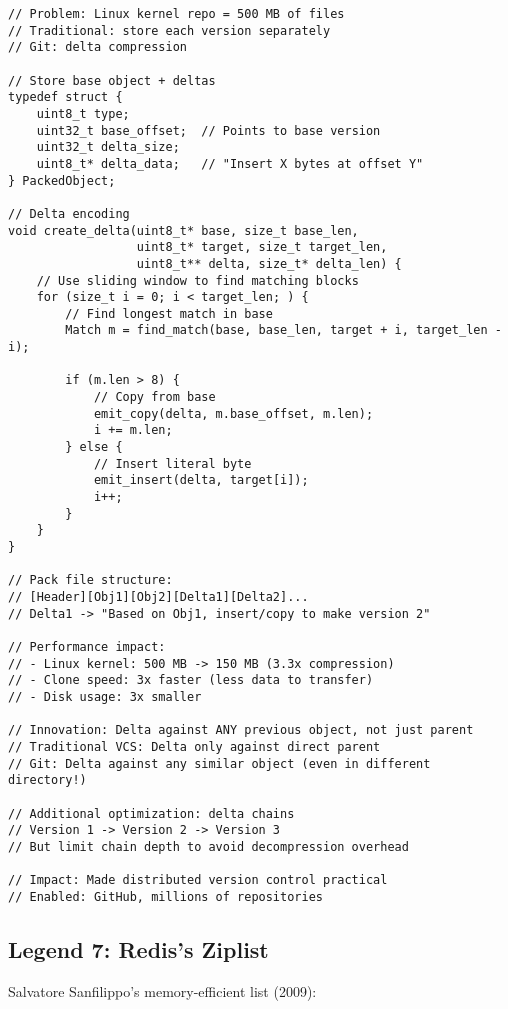 \begin{lstlisting}
// Problem: Linux kernel repo = 500 MB of files
// Traditional: store each version separately
// Git: delta compression

// Store base object + deltas
typedef struct {
    uint8_t type;
    uint32_t base_offset;  // Points to base version
    uint32_t delta_size;
    uint8_t* delta_data;   // "Insert X bytes at offset Y"
} PackedObject;

// Delta encoding
void create_delta(uint8_t* base, size_t base_len,
                  uint8_t* target, size_t target_len,
                  uint8_t** delta, size_t* delta_len) {
    // Use sliding window to find matching blocks
    for (size_t i = 0; i < target_len; ) {
        // Find longest match in base
        Match m = find_match(base, base_len, target + i, target_len - i);

        if (m.len > 8) {
            // Copy from base
            emit_copy(delta, m.base_offset, m.len);
            i += m.len;
        } else {
            // Insert literal byte
            emit_insert(delta, target[i]);
            i++;
        }
    }
}

// Pack file structure:
// [Header][Obj1][Obj2][Delta1][Delta2]...
// Delta1 -> "Based on Obj1, insert/copy to make version 2"

// Performance impact:
// - Linux kernel: 500 MB -> 150 MB (3.3x compression)
// - Clone speed: 3x faster (less data to transfer)
// - Disk usage: 3x smaller

// Innovation: Delta against ANY previous object, not just parent
// Traditional VCS: Delta only against direct parent
// Git: Delta against any similar object (even in different directory!)

// Additional optimization: delta chains
// Version 1 -> Version 2 -> Version 3
// But limit chain depth to avoid decompression overhead

// Impact: Made distributed version control practical
// Enabled: GitHub, millions of repositories
\end{lstlisting}

\subsection{Legend 7: Redis's Ziplist}

Salvatore Sanfilippo's memory-efficient list (2009):

